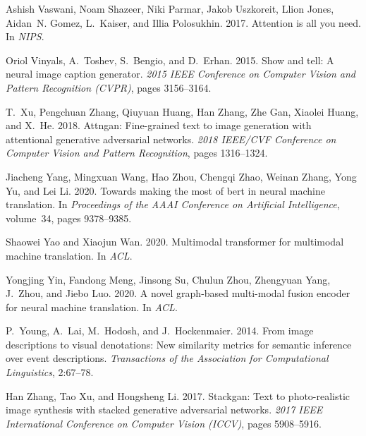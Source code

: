 \documentclass[11pt]{article}
\begin{document}
\begin{thebibliography}{36}
Ashish Vaswani, Noam Shazeer, Niki Parmar, Jakob Uszkoreit, Llion Jones,
  Aidan~N. Gomez, L.~Kaiser, and Illia Polosukhin. 2017.
\newblock Attention is all you need.
\newblock In \emph{NIPS}.

Oriol Vinyals, A.~Toshev, S.~Bengio, and D.~Erhan. 2015.
\newblock Show and tell: A neural image caption generator.
\newblock \emph{2015 IEEE Conference on Computer Vision and Pattern Recognition
  (CVPR)}, pages 3156--3164.

T.~Xu, Pengchuan Zhang, Qiuyuan Huang, Han Zhang, Zhe Gan, Xiaolei Huang, and
  X.~He. 2018.
\newblock Attngan: Fine-grained text to image generation with attentional
  generative adversarial networks.
\newblock \emph{2018 IEEE/CVF Conference on Computer Vision and Pattern
  Recognition}, pages 1316--1324.

Jiacheng Yang, Mingxuan Wang, Hao Zhou, Chengqi Zhao, Weinan Zhang, Yong Yu,
  and Lei Li. 2020.
\newblock Towards making the most of bert in neural machine translation.
\newblock In \emph{Proceedings of the AAAI Conference on Artificial
  Intelligence}, volume~34, pages 9378--9385.

Shaowei Yao and Xiaojun Wan. 2020.
\newblock Multimodal transformer for multimodal machine translation.
\newblock In \emph{ACL}.

Yongjing Yin, Fandong Meng, Jinsong Su, Chulun Zhou, Zhengyuan Yang, J.~Zhou,
  and Jiebo Luo. 2020.
\newblock A novel graph-based multi-modal fusion encoder for neural machine
  translation.
\newblock In \emph{ACL}.

P.~Young, A.~Lai, M.~Hodosh, and J.~Hockenmaier. 2014.
\newblock From image descriptions to visual denotations: New similarity metrics
  for semantic inference over event descriptions.
\newblock \emph{Transactions of the Association for Computational Linguistics},
  2:67--78.

Han Zhang, Tao Xu, and Hongsheng Li. 2017.
\newblock Stackgan: Text to photo-realistic image synthesis with stacked
  generative adversarial networks.
\newblock \emph{2017 IEEE International Conference on Computer Vision (ICCV)},
  pages 5908--5916.


\end{thebibliography}
\end{document}
